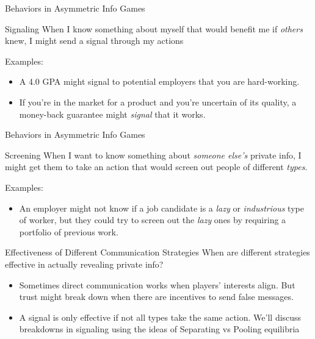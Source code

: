 
\begin{frame}{Behaviors in Asymmetric Info Games}
  \begin{block}{Signaling}
    When I know something about myself 
    that would benefit me if \textit{others} knew,
    I might send a \alert{signal} through my actions
  \end{block}
  Examples:
  \begin{itemize}
    \item
    A 4.0 GPA might signal to potential employers that you are hard-working.
    \item
    If you're in the market for a product and you're uncertain of its quality,
    a money-back guarantee might \textit{signal} that it works.
  \end{itemize}
\end{frame}


\begin{frame}{Behaviors in Asymmetric Info Games}
  \begin{block}{Screening}
    When I want to know something about \textit{someone else's} private info,
    I might get them to take an action that would \alert{screen} out 
    people of different \textit{types}.
  \end{block}
  Examples:
  \begin{itemize}
    \item 
    An employer might not know if a job candidate is a \textit{lazy}
    or \textit{industrious} type of worker,
    but they could try to screen out the \textit{lazy} ones
    by requiring a portfolio of previous work.
  \end{itemize}
\end{frame}


\begin{frame}{Effectiveness of Different Communication Strategies}
  When are different strategies effective in actually revealing private info?
  \begin{itemize}
    \item 
    Sometimes direct communication works when players' interests align.
    But trust might break down when there are incentives to send false messages.
    \item 
    A signal is only effective if not all types take the same action.
    We'll discuss breakdowns in signaling using the ideas of 
    \alert{Separating} vs \alert{Pooling} equilibria
  \end{itemize}
\end{frame}

